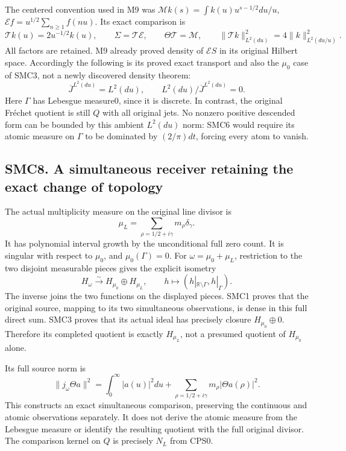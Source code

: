 The centered convention used in M9 was
\(\mathcal M k(s)=\int k(u)u^{s-1/2}du/u\),
\(\mathcal E f=u^{1/2}\sum_{n\ge1}f(nu)\). Its exact comparison is \[
\mathcal T k(u)=2u^{-1/2}k(u),\qquad
\Sigma=\mathcal T\mathcal E,\qquad
\Theta\mathcal T=\mathcal M,\qquad
\|\mathcal T k\|_{L^2(du)}^2=4\|k\|_{L^2(du/u)}^2.
\tag{SMC7.3}
\] All factors are retained. M9 already proved density of
\(\mathcal E S\) in its original Hilbert space. Accordingly the
following is its proved exact transport and also the \(\mu_0\) case of
SMC3, not a newly discovered density theorem: \[
\overline J^{L^2(du)}=L^2(du),\qquad
L^2(du)/\overline J^{L^2(du)}=0.
\tag{SMC7.4}
\] Here \(\Gamma\) has Lebesgue measure0, since it is discrete. In
contrast, the original Fréchet quotient is still \(Q\) with all original
jets. No nonzero positive descended form can be bounded by this ambient
\(L^2(du)\) norm: SMC6 would require its atomic measure on \(\Gamma\) to
be dominated by \((2/\pi)dt\), forcing every atom to vanish.

\subsection{SMC8. A simultaneous receiver retaining the exact change of
topology}\label{smc8.-a-simultaneous-receiver-retaining-the-exact-change-of-topology}

The actual multiplicity measure on the original line divisor is \[
\mu_L=\sum_{\rho=1/2+i\gamma}m_\rho\delta_\gamma.
\tag{SMC8.1}
\] It has polynomial interval growth by the unconditional full zero
count. It is singular with respect to \(\mu_0\), and
\(\mu_0(\Gamma)=0\). For \(\omega=\mu_0+\mu_L\), restriction to the two
disjoint measurable pieces gives the explicit isometry \[
H_\omega\xrightarrow{\sim}H_{\mu_0}\oplus H_{\mu_L},
\qquad h\longmapsto(h|_{\mathbb R\setminus\Gamma},h|_\Gamma).
\tag{SMC8.2}
\] The inverse joins the two functions on the displayed pieces. SMC1
proves that the original source, mapping to its two simultaneous
observations, is dense in this full direct sum. SMC3 proves that its
actual ideal has precisely closure \(H_{\mu_0}\oplus0\). Therefore its
completed quotient is exactly \(H_{\mu_L}\), not a presumed quotient of
\(H_{\mu_0}\) alone.

Its full source norm is \[
\|j_\omega\Theta a\|^2
=\int_0^\infty|a(u)|^2du
+\sum_{\rho=1/2+i\gamma}m_\rho|\Theta a(\rho)|^2.
\tag{SMC8.3}
\] This constructs an exact simultaneous comparison, preserving the
continuous and atomic observations separately. It does not derive the
atomic measure from the Lebesgue measure or identify the resulting
quotient with the full original divisor. The comparison kernel on \(Q\)
is precisely \(N_L\) from CPS0.

